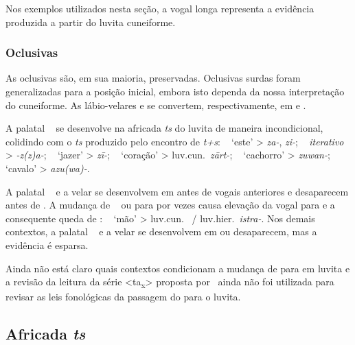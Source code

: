 Nos exemplos utilizados nesta seção, a vogal longa representa a evidência
produzida a partir do luvita cuneiforme.


\subsubsection{Oclusivas}

As oclusivas são, em sua maioria, preservadas.
Oclusivas surdas foram generalizadas para a posição inicial, embora isto dependa
da nossa interpretação do cuneiforme.
As lábio-velares
 e  se convertem,
respectivamente, em  e .

A palatal \pac~ se desenvolve na africada \emph{ts}
do luvita de maneira incondicional, colidindo com o \emph{ts} produzido pelo
encontro de \emph{t+s}:
\pac~ `este' >
\emph{za-}, \emph{zi-};
\pac~ \emph{iterativo} >
\emph{-z{(z)}a-};
\pac~ `jazer' > \emph{zī-};
\pac~ `coração' > luv.cun.\ \emph{zārt-};
\pac~ `cachorro' > \emph{zuwan-};
\pac~ `cavalo' > \emph{azu{(wa)}-}.

A palatal \pac~ e a velar
 se desenvolvem em  antes de vogais
anteriores e desaparecem antes de .
A mudança de \pac~ ou 
para  por vezes causa elevação da vogal  para
 e a consequente queda de :
\pac~ `mão' >
luv.cun.\ \emph{} \slash{} luv.hier.\ \emph{istra-}.
Nos demais contextos, a palatal \pac~ e a velar
 se desenvolvem em  ou desaparecem,
mas a evidência é esparsa.

Ainda não está claro quais contextos condicionam a mudança de
 para  em luvita e a revisão da leitura da
série <ta\textsubscript{x}> proposta por~\citet{Rieken2008} ainda não foi
utilizada para revisar as leis fonológicas da passagem do \pac{} para o luvita.

\subsection{Africada \emph{ts}}


